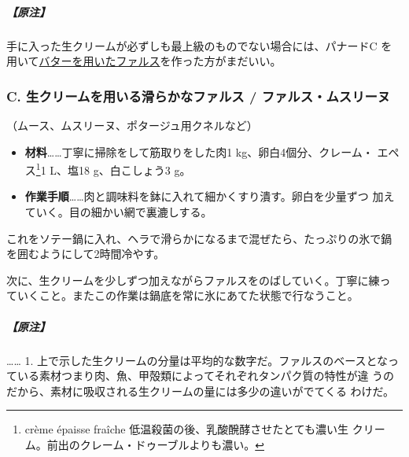 \begin{recette}
\hypertarget{nota-farce-b}{%
\subparagraph{【原注】}\label{nota-farce-b}}

手に入った生クリームが必ずしも最上級のものでない場合には、パナードC を
用いて\protect\hyperlink{farce-a}{バターを用いたファルス}を作った方がまだいい。

\maeaki

\hypertarget{farce-c}{%
\subsubsection{C. 生クリームを用いる滑らかなファルス /
ファルス・ムスリーヌ}\label{farce-c}}



（ムース、ムスリーヌ、ポタージュ用クネルなど）

\begin{itemize}
\item
  \textbf{材料}\ldots{}\ldots{}丁寧に掃除をして筋取りをした肉1
  kg、卵白4個分、クレーム・ エペス\footnote{crème épaisse fraîche
    低温殺菌の後、乳酸醗酵させたとても濃い生
    クリーム。前出のクレーム・ドゥーブルよりも濃い。}1\undemi{} L、塩18
  g、白こしょう3 g。
\item
  \textbf{作業手順}\ldots{}\ldots{}肉と調味料を鉢に入れて細かくすり潰す。卵白を少量ずつ
  加えていく。目の細かい網で裏漉しする。
\end{itemize}

これをソテー鍋に入れ、ヘラで滑らかになるまで混ぜたら、たっぷりの氷で鍋
を囲むようにして2時間冷やす。

次に、生クリームを少しずつ加えながらファルスをのばしていく。丁寧に練っ
ていくこと。またこの作業は鍋底を常に氷にあてた状態で行なうこと。

\hypertarget{nota-farce-c}{%
\subparagraph{【原注】}\label{nota-farce-c}}

\ldots{}\ldots{} 1.
上で示した生クリームの分量は平均的な数字だ。ファルスのベースとなっ
ている素材つまり肉、魚、甲殻類によってそれぞれタンパク質の特性が違
うのだから、素材に吸収される生クリームの量には多少の違いがでてくる
わけだ。


\end{recette}
